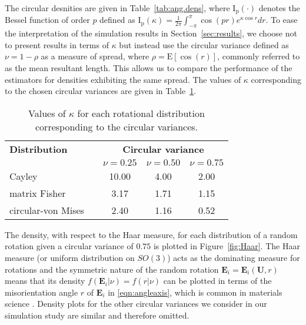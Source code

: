 The circular desnities are given in Table~\ref{tab:ang.dens}, where $\mathrm{I_p}(\cdot)$ denotes the Bessel function of order $p$ defined as  $\mathrm{I_p}(\kappa)=\frac{1}{2\pi}\int_{-\pi}^{\pi}\cos(pr)e^{\kappa\cos r}dr$. To ease the interpretation of the simulation results in Section~\ref{sec:results},  we choose not to present results in terms of $\kappa$ but instead use the circular variance defined as $\nu=1-\rho$ as a measure of spread, where $\rho=\mathrm{E}[\cos(r)]$, commonly referred to as the mean resultant length. This allows us to compare the performance of the estimators for densities exhibiting the same spread.  The values of $\kappa$ corresponding to the chosen circular variances are given in Table~\ref{tab:kappas}.  \\


\begin{table}[h!]
\begin{center}
\caption{Values of $\kappa$ for each rotational distribution corresponding to the circular variances.  \label{tab:kappas}}\vspace{-0.4cm}
\begin{tabular}{l l ccc}\hline
{\bf Distribution} & & \multicolumn{3}{c}{\bf Circular variance} \\
& & $\nu=0.25$ &$\nu=0.50$ & $\nu=0.75$\\ \hline \hline
Cayley & & 10.00 & 4.00 & 2.00 \\
matrix Fisher & & 3.17 & 1.71 & 1.15\\
circular-von Mises & & 2.40 & 1.16 & 0.52\\ \hline
\end{tabular}
\end{center}
\end{table}

The density, with respect to the Haar measure, for each distribution of a random rotation given a circular variance of $0.75$ is plotted in Figure~\ref{fig:Haar}.  The Haar measure (or uniform distribution on $SO(3)$) acts as the dominating measure for rotations and the symmetric nature of the random rotation $\bm E_i=\bm E_i(\bm U,r)$ means that its density $f(\bm E_i|\nu)=f(r|\nu)$ can be plotted in terms of the misorientation angle $r$ of $\bm E_i$ in \eqref{eqn:angleaxis}, which is common in materials science \citep{matthies88, savyolova95}.  Density plots for the other circular variances we consider in our simulation study are similar and therefore omitted.

